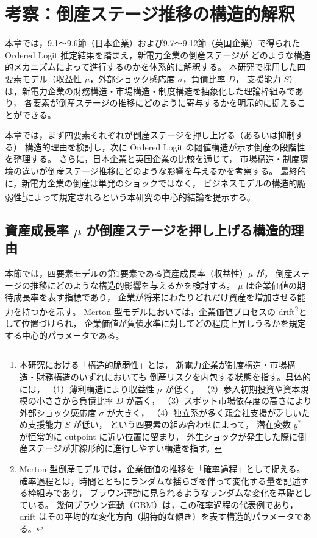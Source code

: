 \chapter{考察：倒産ステージ推移の構造的解釈}
\label{chap:structural_interpretation}


本章では，9.1～9.6節（日本企業）および9.7～9.12節（英国企業）で得られた
Ordered Logit 推定結果を踏まえ，新電力企業の倒産ステージが
どのような構造的メカニズムによって進行するのかを体系的に解釈する。
本研究で採用した四要素モデル（収益性 $\mu$，外部ショック感応度 $\sigma$，負債比率 $D$，
支援能力 $S$）は，新電力企業の財務構造・市場構造・制度構造を抽象化した理論枠組みであり，
各要素が倒産ステージの推移にどのように寄与するかを明示的に捉えることができる。

本章では，まず四要素それぞれが倒産ステージを押し上げる（あるいは抑制する）
構造的理由を検討し，次に Ordered Logit の閾値構造が示す倒産の段階性を整理する。
さらに，日本企業と英国企業の比較を通じて，
市場構造・制度環境の違いが倒産ステージ推移にどのような影響を与えるかを考察する。
最終的に，新電力企業の倒産は単発のショックではなく，
ビジネスモデルの構造的脆弱性\footnote{本研究における「構造的脆弱性」とは，
新電力企業が制度構造・市場構造・財務構造のいずれにおいても
倒産リスクを内包する状態を指す。具体的には，
（1）薄利構造により収益性 $\mu$ が低く，
（2）参入初期投資や資本規模の小ささから負債比率 $D$ が高く，
（3）スポット市場依存度の高さにより外部ショック感応度 $\sigma$ が大きく，
（4）独立系が多く親会社支援が乏しいため支援能力 $S$ が低い，
という四要素の組み合わせによって，
潜在変数 $y^*$ が恒常的に cutpoint に近い位置に留まり，
外生ショックが発生した際に倒産ステージが非線形的に進行しやすい構造を指す。}によって規定されるという本研究の中心的結論を提示する。


\section{資産成長率 $\mu$ が倒産ステージを押し上げる構造的理由}

本節では，四要素モデルの第1要素である資産成長率（収益性）$\mu$ が，
倒産ステージの推移にどのような構造的影響を与えるかを検討する。
$\mu$ は企業価値の期待成長率を表す指標であり，
企業が将来にわたりどれだけ資産を増加させる能力を持つかを示す。
Merton 型モデルにおいては，企業価値プロセスの drift\footnote{
Merton 型倒産モデルでは，企業価値の推移を「確率過程」として捉える。
確率過程とは，時間とともにランダムな揺らぎを伴って変化する量を記述する枠組みであり，
ブラウン運動に見られるようなランダムな変化を基礎としている。
幾何ブラウン運動（GBM）は，この確率過程の代表例であり，
drift はその平均的な変化方向（期待的な傾き）を表す構造的パラメータである。}として位置づけられ，
企業価値が負債水準に対してどの程度上昇しうるかを規定する中心的パラメータである。

